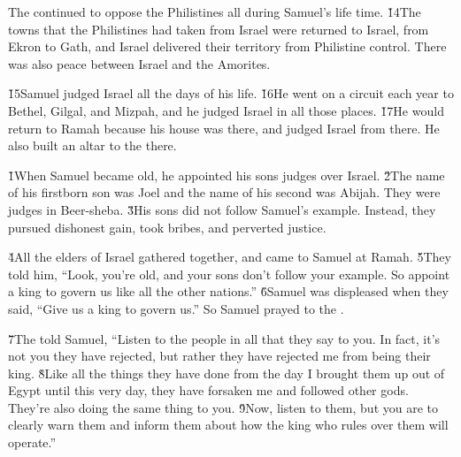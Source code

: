 The  continued to oppose the Philistines all during Samuel's life time. \v{14}The towns that the Philistines had taken from Israel were returned to Israel, from Ekron to Gath, and Israel delivered their territory from Philistine control. There was also peace between Israel and the Amorites.

\v{15}Samuel judged Israel all the days of his life. \v{16}He went on a circuit each year to Bethel, Gilgal, and Mizpah, and he judged Israel in all those places. \v{17}He would return to Ramah because his house was there, and judged Israel from there. He also built an altar to the  there.

\v{1}When Samuel became old, he appointed his sons judges over Israel. \v{2}The name of his firstborn son was Joel and the name of his second was Abijah. They were judges in Beer-sheba. \v{3}His sons did not follow Samuel's example. Instead, they pursued dishonest gain, took bribes, and perverted justice.

\v{4}All the elders of Israel gathered together, and came to Samuel at Ramah. \v{5}They told him, ``Look, you're old, and your sons don't follow your example. So appoint a king to govern us like all the other nations.'' \v{6}Samuel was displeased when they said, ``Give us a king to govern us.'' So Samuel prayed to the .

\v{7}The  told Samuel, ``Listen to the people in all that they say to you. In fact, it's not you they have rejected, but rather they have rejected me from being their king. \v{8}Like all the things they have done from the day I brought them up out of Egypt until this very day, they have forsaken me and followed other gods. They're also doing the same thing to you. \v{9}Now, listen to them, but you are to clearly warn them and inform them about how the king who rules over them will operate.''

